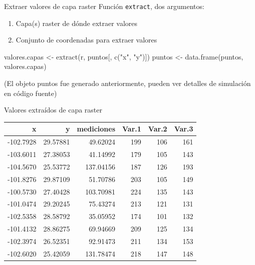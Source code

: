 \documentclass[
  11pt,
  ignorenonframetext,
]{beamer}
\newenvironment{Shaded}{}{}
\newcommand{\FunctionTok}[1]{\textcolor[rgb]{0.02,0.16,0.49}{#1}}
\newcommand{\NormalTok}[1]{#1}
\newcommand{\OtherTok}[1]{\textcolor[rgb]{0.00,0.44,0.13}{#1}}
\newcommand{\StringTok}[1]{\textcolor[rgb]{0.25,0.44,0.63}{#1}}
\begin{document}
\begin{frame}[fragile]{Extraer valores de capa raster}
\protect\hypertarget{extraer-valores-de-capa-raster}{}
Función \texttt{extract}, dos argumentos:

\begin{enumerate}
\item
  Capa(s) raster de dónde extraer valores
\item
  Conjunto de coordenadas para extraer valores
\end{enumerate}

\begin{Shaded}
\begin{Highlighting}[]
\NormalTok{valores.capas }\OtherTok{\textless{}{-}} \FunctionTok{extract}\NormalTok{(r, puntos[, }\FunctionTok{c}\NormalTok{(}\StringTok{"x"}\NormalTok{, }\StringTok{"y"}\NormalTok{)])}
\NormalTok{puntos }\OtherTok{\textless{}{-}} \FunctionTok{data.frame}\NormalTok{(puntos, valores.capas)}
\end{Highlighting}
\end{Shaded}

(El objeto puntos fue generado anteriormente, pueden ver detalles de
simulación en código fuente)
\end{frame}

\begin{frame}{Valores extraídos de capa raster}
\protect\hypertarget{valores-extrauxeddos-de-capa-raster}{}
\begin{longtable}[]{@{}rrrrrr@{}}
\toprule()
x & y & mediciones & Var.1 & Var.2 & Var.3 \\
\midrule()
\endhead
-102.7928 & 29.57881 & 49.62024 & 199 & 106 & 161 \\
-103.6011 & 27.38053 & 41.14992 & 179 & 105 & 143 \\
-104.5670 & 25.53772 & 137.04156 & 187 & 126 & 193 \\
-101.8276 & 29.87109 & 51.70786 & 203 & 105 & 149 \\
-100.5730 & 27.40428 & 103.70981 & 224 & 135 & 143 \\
-101.0474 & 29.20245 & 75.43274 & 213 & 121 & 131 \\
-102.5358 & 28.58792 & 35.05952 & 174 & 101 & 132 \\
-101.4132 & 28.86275 & 69.94669 & 209 & 125 & 134 \\
-102.3974 & 26.52351 & 92.91473 & 211 & 134 & 153 \\
-102.6020 & 25.42059 & 131.78474 & 218 & 147 & 148 \\
\bottomrule()
\end{longtable}
\end{frame}
\end{document}
